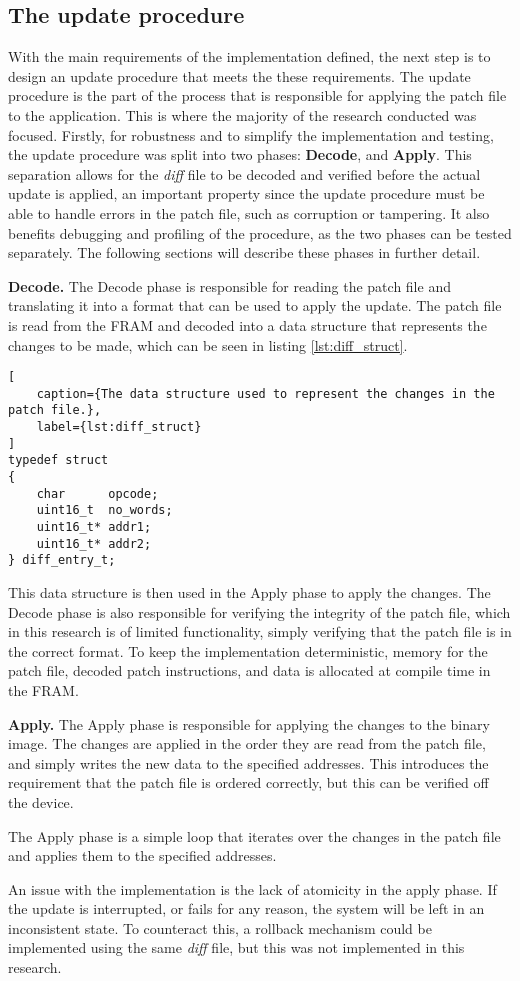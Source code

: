 
\subsection{The update procedure}\label{sec:updateprocedure}
With the main requirements of the implementation defined, the next step is to design an update procedure that meets the these requirements. The update procedure is the part of the process that is responsible for applying the patch file to the application. This is where the majority of the research conducted was focused. Firstly, for robustness and to simplify the implementation and testing, the update procedure was split into two phases: \textbf{Decode}, and \textbf{Apply}. This separation allows for the \textit{diff} file to be decoded and verified before the actual update is applied, an important property since the update procedure must be able to handle errors in the patch file, such as corruption or tampering. It also benefits debugging and profiling of the procedure, as the two phases can be tested separately. The following sections will describe these phases in further detail. 

\textbf{Decode.}
The Decode phase is responsible for reading the patch file and translating it into a format that can be used to apply the update. The patch file is read from the FRAM and decoded into a data structure that represents the changes to be made, which can be seen in listing \ref{lst:diff_struct}. 
\begin{lstlisting}[
    caption={The data structure used to represent the changes in the patch file.},
    label={lst:diff_struct}
]
typedef struct  
{
    char      opcode;
    uint16_t  no_words;
    uint16_t* addr1;
    uint16_t* addr2;
} diff_entry_t;
\end{lstlisting}
This data structure is then used in the Apply phase to apply the changes. The Decode phase is also responsible for verifying the integrity of the patch file, which in this research is of limited functionality, simply verifying that the patch file is in the correct format. To keep the implementation deterministic, memory for the patch file, decoded patch instructions, and data is allocated at compile time in the FRAM.

\textbf{Apply.}
The Apply phase is responsible for applying the changes to the binary image. The changes are applied in the order they are read from the patch file, and simply writes the new data to the specified addresses. This introduces the requirement that the patch file is ordered correctly, but this can be verified off the device. 

The Apply phase is a simple loop that iterates over the changes in the patch file and applies them to the specified addresses. 

An issue with the implementation is the lack of atomicity in the apply phase. If the update is interrupted, or fails for any reason, the system will be left in an inconsistent state. To counteract this, a rollback mechanism could be implemented using the same \textit{diff} file, but this was not implemented in this research. 
